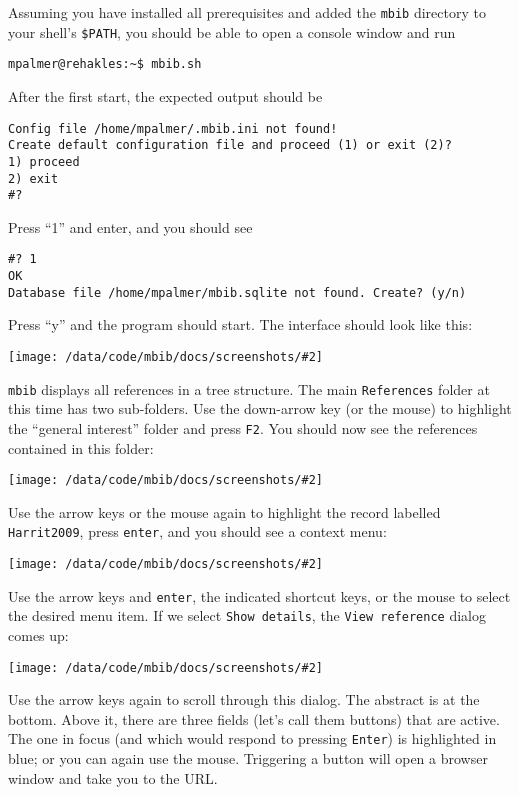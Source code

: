 \documentclass[10pt]{article}
\newcommand*{\mbib}{\texttt{mbib}\xspace}
\newcommand{\screenshot}[2][]{%
\begin{center}
\texttt{[image: /data/code/mbib/docs/screenshots/\#2]}
\end{center}}
\begin{document}
Assuming you have installed all prerequisites and added the \mbib directory to your shell's \texttt{\$PATH}, you should be able to open a console window and run 

\begin{verbatim}
mpalmer@rehakles:~$ mbib.sh
\end{verbatim}

\noindent After the first start, the expected output should be 

\begin{verbatim}
Config file /home/mpalmer/.mbib.ini not found!
Create default configuration file and proceed (1) or exit (2)?
1) proceed
2) exit
#? 
\end{verbatim}

\noindent Press ``1'' and enter, and you should see

\begin{verbatim}
#? 1
OK
Database file /home/mpalmer/mbib.sqlite not found. Create? (y/n) 
\end{verbatim}

\noindent Press ``y'' and the program should start. The interface should look like this:

\screenshot{initial-screen}

\noindent \mbib displays all references in a tree structure. The main \texttt{References} folder at this time has two sub-folders. Use the down-arrow key (or the mouse) to highlight the ``general interest'' folder and press \texttt{F2}. You should now see the references contained in this folder:

\screenshot{f2-pressed}

\noindent Use the arrow keys or the mouse again to highlight the record labelled \texttt{Harrit2009}, press \texttt{enter}, and you should see a context menu:

\screenshot{reference-menu}

\noindent Use the arrow keys and \texttt{enter}, the indicated shortcut keys, or the mouse to select the desired menu item. If we select \texttt{Show details}, the \texttt{View reference} dialog comes up:

\screenshot{refview}

\noindent Use the arrow keys again to scroll through this dialog. The abstract is at the bottom. Above it, there are three fields (let's call them buttons) that are active. The one in focus (and which would respond to pressing \texttt{Enter}) is highlighted in blue; or you can again use the mouse. Triggering a button will open a browser window and take you to the URL. 
\end{document}
